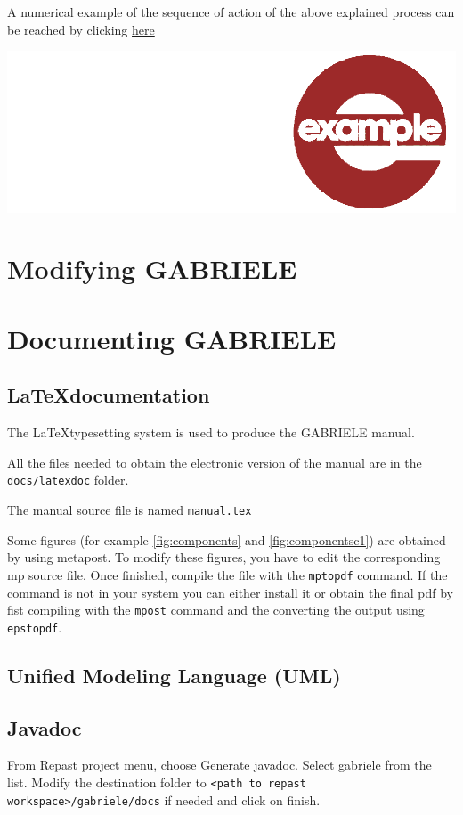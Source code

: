 \documentclass{book}
\newcommand{\umllocation}{file:///Users/giulioni/Dropbox/svn/sfcabm_my/documentation}
\begin{document}
\vskip1cm
A numerical example of the sequence of action of the above explained process can be reached by clicking \href{\umllocation/example_firm_good_conditions.html}{here}
\begin{marginfigure}
\hskip8mm	\includegraphics[scale=0.07]{example.png}
\end{marginfigure}



\part{Modifying GABRIELE}

\part{Documenting GABRIELE}


\chapter{\LaTeX documentation}
The \LaTeX typesetting system is used to produce the GABRIELE manual.

All the files needed to obtain the electronic version of the manual are in the \verb+docs/latexdoc+ folder.

The manual source file is named \verb+manual.tex+

Some figures (for example \ref{fig:components} and \ref{fig:componentsc1}) are obtained by using metapost.
To modify these figures, you have to edit the corresponding mp source file. Once finished, compile the file with the \verb+mptopdf+ command. If the command is not in your system you can either install it or obtain the final pdf by fist compiling with the \verb+mpost+ command and the converting the output using \verb+epstopdf+.



\chapter{Unified Modeling Language (UML)}


\chapter{Javadoc}

From Repast project menu, choose Generate javadoc. Select gabriele from the list. Modify the destination folder to 
\verb+<path to repast workspace>/gabriele/docs+ if needed and click on finish.
\end{document}
